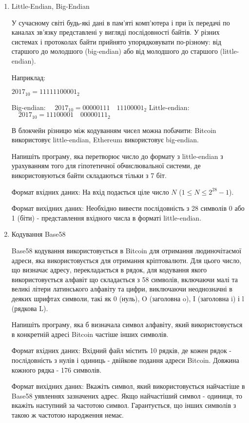 \documentclass[]{article}
\begin{document}
\begin{enumerate}
\item

Little-Endian, Big-Endian

У сучасному світі будь-які дані в пам'яті комп'ютера і при їх передачі по каналах зв'язку представлені у вигляді послідовності байтів. У різних системах і протоколах байти прийнято упорядковувати по-різному: від старшого до молодшого (big-endian) або від молодшого до старшого (little-endian).

Наприклад: 

$2017_{10} = 11111100001_{2}$

Big-endian: $ \quad 2017_{10} = 00000111 \quad 11100001_{2}$
Little-endian:$ \quad 2017_{10} = 11100001\quad 00000111_{2} $

В блокчейн різницю між кодуванням чисел можна побачити: Bitcoin використовує little-endian, Ethereum використовує big-endian.

Напишіть програму, яка перетворює число до формату з little-endian з урахуванням того для гіпотетичної обчислювальної системи, де використовуються байти складаються тільки з 7 біт.

Формат вхідних даних:
На вхід подається ціле число $N $ ($1\le N \le 2^{28}-1 $).

Формат вихідних даних:
Необхідно вивести послідовність з 28 символів 0 або 1 (біти) - представлення вхідного числа в форматі little-endian.

\item
Кодування Base58

Base58 кодування використовується в Bitcoin для отримання людиночітаємої адреси, яка використовується для отримання
кріптовалюти. Для цього число, що визначає адресу, перекладається в рядок, для кодування якого використовується алфавіт
що складається з 58 символів, включаючи малі та великі літери латинського алфавіту та цифри, виключаючи неоднозначні в
деяких шрифтах символи, такі як 0 (нуль), O (заголовна o), I (заголовна i) і l (рядкова L).

Напишіть програму, яка б визначала символ алфавіту, який використовується в конкретній адресі Bitcoin частіше
інших символів.

Формат вхідних даних:
Вхідний файл містить 10 рядків, де кожен рядок - послідовність з нулів і одиниць - двійкове подання адреси Bitcoin. Довжина кожного рядка - 176 символів.

Формат вихідних даних:
Вкажіть символ, який використовується найчастіше в Base58 уявленнях зазначених адрес. Якщо найчастіший символ -
одиниця, то вкажіть наступний за частотою символ. Гарантується, що інших символів з такою ж частотою народження
немає.


\end{enumerate}
\end{document}
